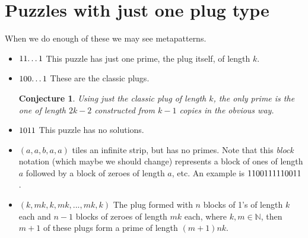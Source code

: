 \documentclass[10pt]{article}
\newtheorem{conjecture}[theorem]{Conjecture}
\numberwithin{equation}{section}
\newenvironment{anote}
               {{\textcolor{blue}{Note:}}
                 \itshape
               }
               {}
\newcommand{\plug}[1]{%
\mbox{{\textbf\texttt #1}}
}
\begin{document}
\section{Puzzles with just one plug type}

\begin{anote}
When we do enough of these we may see metapatterns.
\end{anote}
\begin{itemize}
    \item $\plug{11\ldots 1}$
    This puzzle has just one prime, the plug itself, of length $k$. 
    \item $\plug{100\ldots 1}$ These are the classic plugs. 
    \begin{conjecture}
    Using just the classic plug of length $k$, the only prime is the  one of length $2k-2$ constructed from $k-1$ copies in the obvious way.
    \end{conjecture}
    
    \item $\plug{1011}$
    This puzzle has no solutions.
    \item $(a,a, b, a, a)$ tiles an infinite strip, but has no primes. Note that this \emph{block} notation (which maybe we should change) represents a block of ones of length $a$ followed by a block of zeroes of length $a$, etc. An example is $\plug{1100111110011}$.
    \item $(k,mk,k,mk,...,mk,k)$ The plug formed with $n$ blocks of 1's of length $k$ each and $n-1$ blocks of zeroes of length $mk$ each, where $k,m \in {\mathbb N}$, then $m+1$ of these plugs form a prime of length $(m+1)nk$.
    

\end{itemize}
\end{document}
